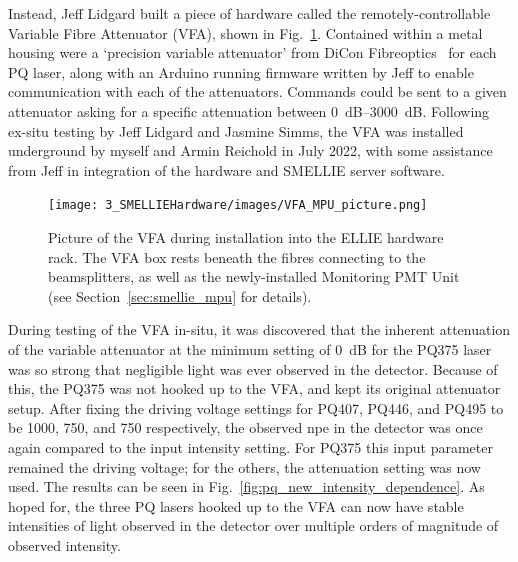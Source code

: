 Instead, Jeff Lidgard built a piece of hardware called the remotely-controllable Variable Fibre Attenuator (VFA), shown in Fig.~\ref{fig:vfa_picture}. Contained within a metal housing were a `precision variable attenuator' from DiCon Fibreoptics~\cite{} %
for each PQ laser, along with an Arduino running firmware written by Jeff to enable communication with each of the attenuators. Commands could be sent to a given attenuator asking for a specific attenuation between \SIrange{0}{3000}{\dB}.
Following ex-situ testing by Jeff Lidgard and Jasmine Simms, the VFA was installed underground by myself and Armin Reichold in July 2022, with some assistance from Jeff in integration of the hardware and SMELLIE server software.

\begin{figure}
    \centering
    \texttt{[image: 3\_SMELLIEHardware/images/VFA\_MPU\_picture.png]}
    \caption[Picture of the VFA during installation into the ELLIE hardware rack]
    {Picture of the VFA during installation into the ELLIE hardware rack. The VFA box rests beneath the fibres connecting to the beamsplitters, as well as the newly-installed Monitoring PMT Unit (see Section~\ref{sec:smellie_mpu} for details).}
    \label{fig:vfa_picture}
\end{figure}

During testing of the VFA in-situ, it was discovered that the inherent attenuation of the variable attenuator at the minimum setting of \SI{0}{\dB} for the PQ375 laser was so strong that negligible light was ever observed in the detector. Because of this, the PQ375 was not hooked up to the VFA, and kept its original attenuator setup. After fixing the driving voltage settings for PQ407, PQ446, and PQ495 to be 1000, 750, and 750 respectively, %
the observed npe in the detector was once again compared to the input intensity setting. For PQ375 this input parameter remained the driving voltage; for the others, the attenuation setting was now used. The results can be seen in Fig.~\ref{fig:pq_new_intensity_dependence}. As hoped for, the three PQ lasers hooked up to the VFA can now have stable intensities of light observed in the detector over multiple orders of magnitude of observed intensity.

